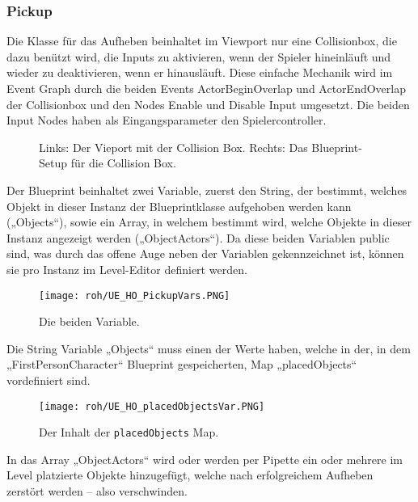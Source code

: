 \subsubsection{Pickup}
Die Klasse für das Aufheben beinhaltet im Viewport nur eine Collisionbox, die dazu benützt wird, die Inputs zu aktivieren, wenn der Spieler hineinläuft und wieder zu deaktivieren, wenn er hinausläuft. Diese einfache Mechanik wird im Event Graph durch die beiden Events ActorBeginOverlap und ActorEndOverlap der Collisionbox und den Nodes Enable und Disable Input umgesetzt. Die beiden Input Nodes haben als Eingangsparameter den Spielercontroller.
\begin{figure}[H]
    \caption{Links: Der Vieport mit der Collision Box. Rechts: Das Blueprint-Setup für die Collision Box.}
    \label{UE:HO_PickupCollBox}
\end{figure}
Der Blueprint beinhaltet zwei Variable, zuerst den String, der bestimmt, welches Objekt in dieser Instanz der Blueprintklasse aufgehoben werden kann („Objects“), sowie ein Array, in welchem bestimmt wird, welche Objekte in dieser Instanz angezeigt werden („ObjectActors“). Da diese beiden Variablen public sind, was durch das offene Auge neben der Variablen gekennzeichnet ist, können sie pro Instanz im Level-Editor definiert werden.
\begin{figure}[H]
    \centering
    \texttt{[image: roh/UE\_HO\_PickupVars.PNG]}
    \caption{Die beiden Variable.}
    \label{UE:HO_PickupVars}
\end{figure}
Die String Variable „Objects“ muss einen der Werte haben, welche in der, in dem „FirstPersonCharacter“ Blueprint gespeicherten, Map „placedObjects“ vordefiniert sind.
\begin{figure}[H]
    \centering
    \texttt{[image: roh/UE\_HO\_placedObjectsVar.PNG]}
    \caption{Der Inhalt der {\tt placedObjects} Map.}
    \label{UE:HO_placedObjectsVar}
\end{figure}
In das Array „ObjectActors“ wird oder werden per Pipette ein oder mehrere im Level platzierte Objekte hinzugefügt, welche nach erfolgreichem Aufheben zerstört werden – also verschwinden.

